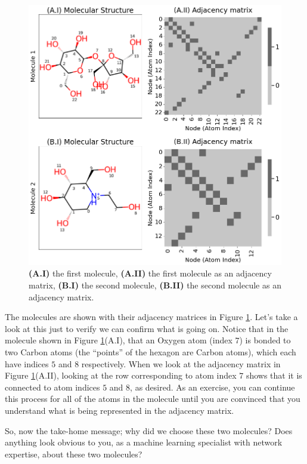 \begin{figure}
    \centering
    \includegraphics[width=0.9\linewidth]{next/Images/molecule_ex.png}
    \caption[Example of two molecule adjacency matrices]{\textbf{(A.I)} the first molecule, \textbf{(A.II)} the first molecule as an adjacency matrix, \textbf{(B.I)} the second molecule, \textbf{(B.II)} the second molecule as an adjacency matrix.}
    \label{fig:next:gnn:ex}
\end{figure}

The molecules are shown with their adjacency matrices in Figure \ref{fig:next:gnn:ex}. Let's take a look at this just to verify we can confirm what is going on. Notice that in the molecule shown in Figure \ref{fig:next:gnn:ex}(A.I), that an Oxygen atom (index $7$) is bonded to two Carbon atoms (the ``points'' of the hexagon are Carbon atoms), which each have indices $5$ and $8$ respectively. When we look at the adjacency matrix in Figure \ref{fig:next:gnn:ex}(A.II), looking at the row corresponding to atom index $7$ shows that it is connected to atom indices $5$ and $8$, as desired. As an exercise, you can continue this process for all of the atoms in the molecule until you are convinced that you understand what is being represented in the adjacency matrix.

So, now the take-home message; why did we choose these two molecules? Does anything look obvious to you, as a machine learning specialist with network expertise, about these two molecules?


